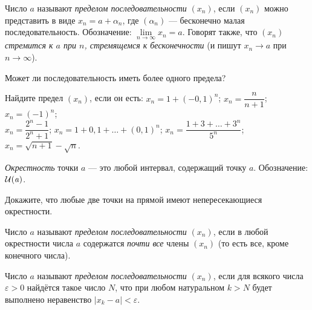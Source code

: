 \documentclass[a4paper, 12pt]{article}
\begin{document}


 \label{limit3} Число $a$ называют \textit{пределом последовательности}
$(x_n)$, если %
$(x_n)$ можно представить в виде
$x_n=a+\alpha_n$, где $(\alpha_n)$ --- бесконечно малая
последовательность.
Обозначение: $\lim\limits_{n \to \infty} x_n = a$.
Говорят также, что \textit{$(x_n)$ стремится к $a$ при $n$,
стремящемся к бесконечности}
(и пишут $x_n \to a$ при~\hbox{$n \to \infty$)}.

Может ли последовательность
иметь более одного предела?

 Найдите предел
$(x_n)$, если он есть:
 \hbox{$x_n=1+(-0,1)^n$;}
 $x_n=\dfrac{n}{n+1}$;
 $x_n=(-1)^n$;\\
 $x_n=\dfrac{2^n-1}{2^n+1}$;
 $x_n=1+0,1+\ldots+(0,1)^n$;
 $x_n=\dfrac{1+3+\ldots+3^n}{5^{n}}$;
 $x_n=\sqrt{n+1}-\sqrt{n}$.

\textit{Окрестность} точки $a$ %
--- это %
любой интервал, содержащий точку $a$.
Обозначение: ${\cal U(\it a)}$. %

Докажите, что любые две точки на прямой имеют непересекающиеся
окрестности.

 \label{limit1} Число $a$ называют \textit{пределом
последовательности}
$(x_n)$, если %
в любой окрестности числа $a$
содержатся \textit{почти все} члены $(x_n)$
(то есть все, кроме конечного числа).

 \label{limit2} Число $a$ называют
\textit{пределом последовательности} $(x_n)$,
если для всякого числа $\varepsilon >0$
найд\"ется такое число $N$, что при любом
натуральном $k > N$ будет выполнено
неравенство $|x_k - a| < \varepsilon$.
\end{document}
